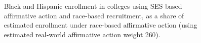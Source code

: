 \begin{figure}[p]
\begin{minipage}{.44\textwidth}
  \end{minipage}%
  \caption{Black and Hispanic enrollment in colleges using SES-based affirmative action and race-based recruitment, as a share of estimated enrollment under race-based affirmative action (using estimated real-world affirmative action weight 260).}
  \label{fig:2}
\end{figure}

